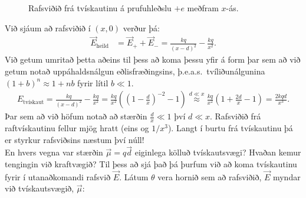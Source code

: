 \begin{figure}[H]
    \centering
{}
    \caption{Rafsviðið frá tvískautinu á prufuhleðslu $+e$ meðfram $x$-ás.}
\end{figure}
Við sjáum að rafsviðið í $(x,0)$ verður þá:
\begin{align*}
    \vec{E}_{\text{heild}} &= \vec{E}_+ + \vec{E}_- = \frac{kq}{(x-d)^2} - \frac{kq}{x^2}.
\end{align*}
Við getum umritað þetta aðeins til þess að koma þessu yfir á form þar sem að við getum notað uppáhaldsnálgun eðlisfræðingsins, þ.e.a.s.~tvíliðunálgunina $(1+b)^n \approx 1 + nb$ fyrir lítil $b \ll 1$.
\begin{align*}
    E_{\text{tvískaut}} = \frac{kq}{(x-d)^2} - \frac{kq}{x^2} = \frac{kq}{x^2}\left( \left(1 - \frac{d}{x} \right)^{-2} - 1 \right) \stackrel{d \ll x}{\approx} \frac{kq}{x^2}\left( 1 + \frac{2d}{x} - 1 \right) = \frac{2kqd}{x^3}.
\end{align*}
Þar sem að við höfum notað að stærðin $\frac{d}{x} \ll 1$ því $d \ll x$. Rafsviðið frá raftvískautinu fellur mjög hratt (eins og $1/x^3$). Langt í burtu frá tvískautinu þá er styrkur rafsviðsins næstum því núll! \\

En hvers vegna var stærðin $\vec{\mu} = q \vec{d}$ eiginlega kölluð tvískautsvægi? Hvaðan kemur tengingin við kraftvægið? Til þess að sjá það þá þurfum við að koma tvískautinu fyrir í utanaðkomandi rafsvið $\vec{E}$. Látum $\theta$ vera hornið sem að rafsviðið, $\vec{E}$ myndar við tvískautsvægið, $\vec{\mu}$:

